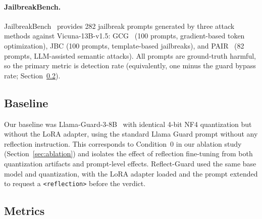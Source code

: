 \documentclass[superintelligence,article,accept,moreauthors]{Definitions/mdpi}
\renewcommand{\hl}[1]{#1}
\begin{document}
\paragraph{\hl{JailbreakBench.}} JailbreakBench~\citep{chao2024jailbreakbench} provides 282 jailbreak prompts generated by three attack methods against Vicuna-13B-v1.5: GCG~\citep{zou2023universal} (100 prompts, gradient-based token optimization), JBC (100 prompts, template-based jailbreaks), and PAIR~\citep{chao2023jailbreaking} (82 prompts, LLM-assisted semantic attacks). All prompts are ground-truth harmful, so the primary metric is detection rate (equivalently, one minus the guard bypass rate; Section~\ref{sec:metrics}).

\subsection{Baseline}

Our baseline was Llama-Guard-3-8B~\citep{metallamaguard3} with identical 4-bit NF4 quantization but without the LoRA adapter, using the standard Llama Guard prompt without any reflection instruction. This corresponds to Condition~0 in our ablation study (Section~\ref{sec:ablation}) and isolates the effect of reflection fine-tuning from both quantization artifacts and prompt-level effects. Reflect-Guard used the same base model and quantization, with the LoRA adapter loaded and the prompt extended to request a \texttt{<reflection>} before the verdict.

\subsection{Metrics}
\label{sec:metrics}
\end{document}

